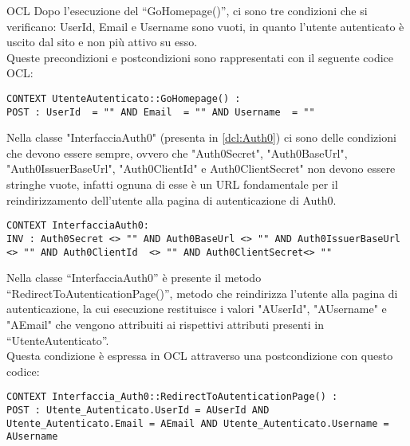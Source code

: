 \begin{listaPersonale}{OCL}
    Dopo l'esecuzione del “GoHomepage()”, ci sono tre condizioni che si verificano: UserId, Email e Username sono vuoti, in quanto l'utente autenticato è uscito dal sito e non più attivo su esso. \\
    Queste precondizioni e postcondizioni sono rappresentati con il seguente codice OCL:
    \begin{lstlisting}
CONTEXT UtenteAutenticato::GoHomepage() :
POST : UserId  = "" AND Email  = "" AND Username  = ""
    \end{lstlisting}





    \begin{center}
        
    \end{center}
    Nella classe "InterfacciaAuth0" (presenta in \ref{dcl:Auth0}) ci sono delle condizioni che devono essere sempre, ovvero che "Auth0Secret", "Auth0BaseUrl", "Auth0IssuerBaseUrl", "Auth0ClientId" e Auth0ClientSecret" non devono essere stringhe vuote, infatti ognuna di esse è un URL fondamentale per il reindirizzamento dell'utente alla pagina di autenticazione di Auth0.
    \begin{lstlisting}
CONTEXT InterfacciaAuth0:
INV : Auth0Secret <> "" AND Auth0BaseUrl <> "" AND Auth0IssuerBaseUrl <> "" AND Auth0ClientId  <> "" AND Auth0ClientSecret<> ""
    \end{lstlisting}

    Nella classe “InterfacciaAuth0”  è presente il metodo “RedirectToAutenticationPage()”, metodo che reindirizza l'utente alla pagina di autenticazione, la cui esecuzione restituisce i valori "AUserId", "AUsername" e "AEmail" che vengono attribuiti ai rispettivi attributi presenti in “UtenteAutenticato”. \\
    Questa condizione è espressa in OCL attraverso una postcondizione con questo codice:
    \begin{lstlisting}
CONTEXT Interfaccia_Auth0::RedirectToAutenticationPage() :
POST : Utente_Autenticato.UserId = AUserId AND Utente_Autenticato.Email = AEmail AND Utente_Autenticato.Username = AUsername
    \end{lstlisting}
    \newpage




\end{listaPersonale}
